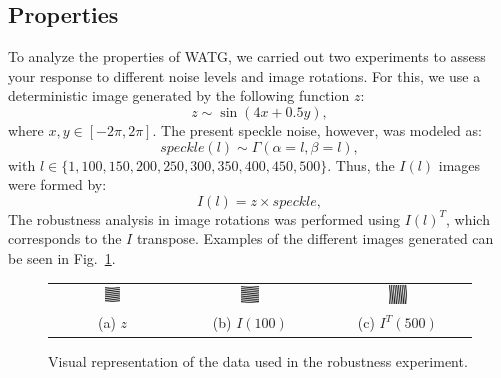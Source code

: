 \documentclass[journal]{IEEEtran}
\begin{document}
\subsection{Properties}

To analyze the properties of WATG, we carried out two experiments to assess your response to different noise levels and image rotations.
For this, we use a deterministic image generated by the following function $z$:
\begin{equation*}
 z \sim \sin (4x + 0.5y), 
\end{equation*}
where  $x, y \in [-2\pi, 2\pi]$.
The present speckle noise, however, was modeled as:
\begin{equation*}
 speckle(l) \sim \Gamma(\alpha = l, \beta = l),
\end{equation*}
with $l \in \{1, 100, 150, 200, 250, 300, 350, 400, 450, 500\}$.
Thus, the $I(l)$ images were formed by:
\begin{equation*}
 I(l) = z \times speckle,
\end{equation*}
The robustness analysis in image rotations was performed using $I(l)^T$, which corresponds to the $I$ transpose.
Examples of the different images generated can be seen in Fig.~\ref{fig:speckle}.

\begin{figure}[hbt]
	\begin{tabular}{ccc}
		\includegraphics[width=0.135\textwidth]{Figures/z.png} &   
		\includegraphics[width=0.135\textwidth]{Figures/z100.png} &
		\includegraphics[width=0.135\textwidth]{Figures/z500t.png} \\
		(a) $z$ &   
		(b) $I(100)$ &
		(c) $I^T(500)$ \\
	\end{tabular}
	\caption{Visual representation of the data used in the robustness experiment.}
	\label{fig:speckle}
\end{figure}
\end{document}
